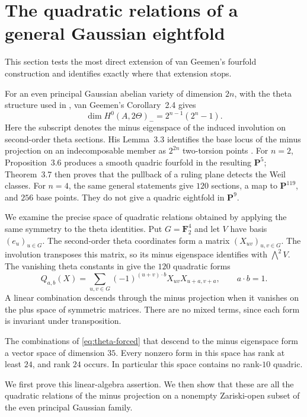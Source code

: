 \section{The quadratic relations of a general Gaussian eightfold}
\label{sec:theta-eightfolds}
This section tests the most direct extension of van Geemen's fourfold construction and identifies exactly where that extension stops.

For an even principal Gaussian abelian variety of dimension $2n$,
with the theta structure used in \cite{vG96}, van Geemen's
Corollary~2.4 gives
\[
 \dim H^0(A,2\Theta)_-=2^{n-1}(2^n-1).
\]
Here the subscript denotes the minus eigenspace of the induced
involution on second-order theta sections.
His Lemma~3.3 identifies the base locus of the minus projection on an indecomposable member as $2^{2n}$ two-torsion points \cite[pp.~621--622]{vG96}. For $n=2$, Proposition~3.6 produces a smooth quadric fourfold in the resulting $\mathbf P^5$; Theorem~3.7 then proves that the pullback of a ruling plane detects the Weil classes. For $n=4$, the same general statements give $120$ sections, a map to $\mathbf P^{119}$, and $256$ base points. They do not give a quadric eightfold in $\mathbf P^9$.

We examine the precise space of quadratic relations obtained by applying the same symmetry to the theta identities. Put $G=\mathbf F_2^4$ and let $V$ have basis $(e_u)_{u\in G}$. The second-order theta coordinates form a matrix $(X_{uv})_{u,v\in G}$. The involution transposes this matrix, so its minus eigenspace identifies with $\bigwedge^2V$. The vanishing theta constants in \cite[Lemma~2.3 and \S3.5]{vG96} give the $120$ quadratic forms
\begin{equation}\label{eq:theta-forced}
 Q_{a,b}(X)=\sum_{u,v\in G}(-1)^{(u+v)\cdot b}
 X_{uv}X_{u+a,v+a},\qquad a\cdot b=1.
\end{equation}
A linear combination descends through the minus projection when it vanishes on the plus space of symmetric matrices. There are no mixed terms, since each form is invariant under transposition.

\begin{theorem}\label{thm:theta-rank}
The combinations of \eqref{eq:theta-forced} that descend to the minus eigenspace form a vector space of dimension $35$. Every nonzero form in this space has rank at least $24$, and rank $24$ occurs. In particular this space contains no rank-$10$ quadric.
\end{theorem}

We first prove this linear-algebra assertion. We then show that these
are all the quadratic relations of the minus projection on a nonempty
Zariski-open subset of the even principal Gaussian family.

